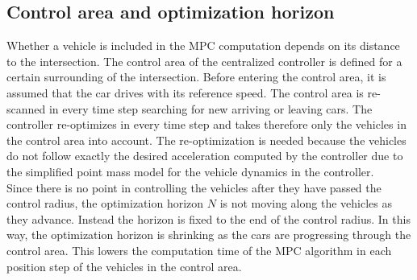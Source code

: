 \documentclass[letterpaper,10pt,conference]{ieeeconf}
\begin{document}

\subsection{Control area and optimization horizon}
Whether a vehicle is included in the MPC computation depends on its distance to the intersection. The control area of the centralized controller is defined for a certain surrounding of the intersection. Before entering the control area, it is assumed that the car drives with its reference speed. The control area is re-scanned in every time step searching for new arriving or leaving cars. The controller re-optimizes in every time step and takes therefore only the vehicles in the control area into account. The re-optimization is needed because the vehicles do not follow exactly the desired acceleration computed by the controller due to the simplified point mass model for the vehicle dynamics in the controller.\\ \indent
Since there is no point in controlling the vehicles after they have passed the control radius, the optimization horizon $N$ is not moving along the vehicles as they advance. Instead the horizon is fixed to the end of the control radius. In this way, the optimization horizon is shrinking as the cars are progressing through the control area. This lowers the computation time of the MPC algorithm in each position step of the vehicles in the control area.
\end{document}
